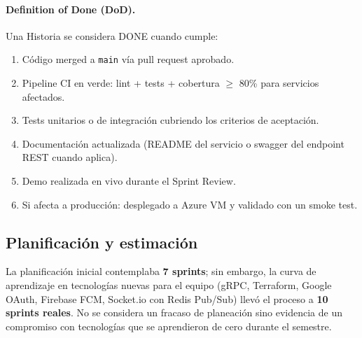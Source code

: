 \documentclass[12pt,a4paper,oneside]{article}
\begin{document}
\paragraph{Definition of Done (DoD).} Una Historia se considera DONE cuando cumple:
\begin{enumerate}[leftmargin=*]
  \item C\'odigo merged a \texttt{main} v\'ia pull request aprobado.
  \item Pipeline CI en verde: lint + tests + cobertura $\geq$ 80\% para servicios afectados.
  \item Tests unitarios o de integraci\'on cubriendo los criterios de aceptaci\'on.
  \item Documentaci\'on actualizada (README del servicio o swagger del endpoint REST cuando aplica).
  \item Demo realizada en vivo durante el Sprint Review.
  \item Si afecta a producci\'on: desplegado a Azure VM y validado con un smoke test.
\end{enumerate}

\subsection{Planificaci\'on y estimaci\'on}

La planificaci\'on inicial contemplaba \textbf{7 sprints}; sin embargo, la curva de aprendizaje en tecnolog\'ias nuevas para el equipo (gRPC, Terraform, Google OAuth, Firebase FCM, Socket.io con Redis Pub/Sub) llev\'o el proceso a \textbf{10 sprints reales}. No se considera un fracaso de planeaci\'on sino evidencia de un compromiso con tecnolog\'ias que se aprendieron de cero durante el semestre.
\end{document}
